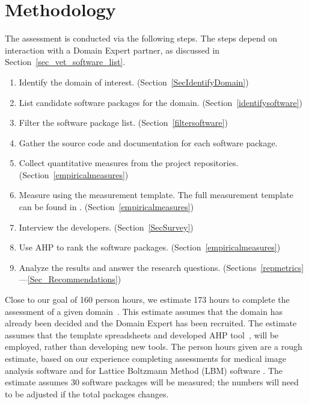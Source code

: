 \documentclass[runningheads]{llncs}
\begin{document}
\section{Methodology} \label{methodology}

The assessment is conducted via the following steps.  The steps depend on
interaction with a Domain Expert partner, as discussed in
Section~\ref{sec_vet_software_list}.

\begin{enumerate}
  \item Identify the domain of interest. (Section~\ref{SecIdentifyDomain})
	\item List candidate software packages for the domain.
	(Section~\ref{identifysoftware})
	\item Filter the software package list. (Section~\ref{filtersoftware})
	\item Gather the source code and documentation for each software package.
	\item Collect quantitative measures from the project repositories.
	(Section~\ref{empiricalmeasures})
	\item Measure using the measurement template.  The full measurement template
	can be found in \cite{SmithEtAl2021}. (Section~\ref{empiricalmeasures})
	\item Interview the developers. (Section~\ref{SecSurvey})
	\item Use AHP to rank the software packages. (Section~\ref{empiricalmeasures})
	\item Analyze the results and answer the research questions. (Sections~\ref{repmetrics}---\ref{Sec_Recommendations}) %
\end{enumerate}

Close to our goal of 160 person hours, we estimate 173 hours to complete the
assessment of a given domain~\cite{SmithEtAl2021}.  This estimate assumes that
the domain has already been decided and the Domain Expert has been recruited.
The estimate assumes that the template spreadsheets and developed AHP
tool~\cite{SmithEtAl2021}, will be employed, rather than developing new tools.
The person hours given are a rough estimate, based on our experience completing
assessments for medical image analysis software \cite{Dong2021} and for Lattice
Boltzmann Method (LBM) software \cite{Michalski2021}.  The estimate assumes 30
software packages will be measured; the numbers will need to be adjusted if the
total packages changes.
\end{document}

